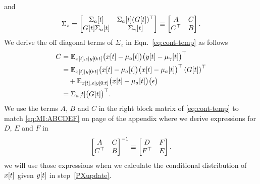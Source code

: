 \begin{enumerate}
  and
  \begin{equation}
    \label{eq:cont-temp}
    \Sigma_z  =
    \begin{bmatrix}
      {\Sigma_a}{[t]} & {\Sigma_a}{[t]} ({G}{[t]})^\top 
      \\ {G}{[t]} {\Sigma_a}{[t]}&{\Sigma_\gamma}{[t]} 
    \end{bmatrix}\equiv
    \begin{bmatrix} A & C \\ C^\top & B \end{bmatrix}.
  \end{equation}
  We derive the off diagonal terms of $\Sigma_z$ in
  Eqn.~\eqref{eq:cont-temp} as follows
  \begin{align}
    C &= \mathbb{E}_{{x}{[t]},\epsilon\mid y[0:t]}
    \big( {x}{[t]} - {\mu_a}{[t]} \big) \big( {y}{[t]}
      - {\mu_\gamma}{[t]} \big)^\top \nonumber \\
    &=  \mathbb{E}_{{x}{[t]}\mid y[0:t]}
    \big( {x}{[t]} - {\mu_a}{[t]} \big)
    \big( {x}{[t]} - {\mu_a}{[t]} \big)^\top
    \left({G}{[t]} \right)^\top \nonumber \\
    & \quad +
    \mathbb{E}_{{x}{[t]},\epsilon\mid y[0:t]}
    \big( {x}{[t]} - {\mu_a}{[t]} \big) \big( \epsilon
    \big) \nonumber \\
    \label{eq:cont:C}
      &= {\Sigma_{a}}{[t]} \big({G}{[t]} \big)^\top .
  \end{align}
  We use the terms $A$, $B$ and $C$ in the right block matrix of
  \eqref{eq:cont-temp} to match \eqref{eq:MI:ABCDEF} on page
  \pageref{eq:MI:ABCDEF} of the appendix where we derive expressions
  for $D$, $E$ and $F$ in 
    \begin{equation*}
      \begin{bmatrix} A & C \\ C^\top & B \end{bmatrix}^{-1} \equiv
      \begin{bmatrix} D & F \\ F^\top & E \end{bmatrix}.
    \end{equation*}
    we will use those expressions when we calculate the conditional
    distribution of ${x}{[t]}$ given ${y}{[t]}$ in
    step~\ref{PXupdate}.


\end{enumerate}
